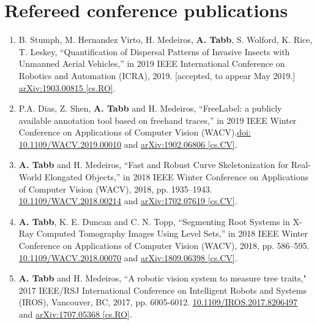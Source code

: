 \documentclass[letterpaper,11pt]{article}
\begin{document}
\section{Refereed conference publications}
\begin{enumerate}[noitemsep, leftmargin=*,resume*]
\item{B. Stumph, M. Hernandez Virto, H. Medeiros, \textbf{A. Tabb}, S. Wolford, K. Rice, T. Leskey, ``Quantification of Dispersal Patterns of Invasive Insects with Unmanned Aerial Vehicles,” in 2019 IEEE International Conference on Robotics and Automation (ICRA), 2019. [accepted, to appear May 2019.] \href{https://arxiv.org/abs/1903.00815}{arXiv:1903.00815 [cs.RO]}.}

\item{P.A.  Dias, Z. Shen, \textbf{A. Tabb} and H. Medeiros, ``FreeLabel: a publicly available annotation tool based on freehand traces,” in 2019 IEEE Winter Conference on Applications of Computer Vision (WACV).\href{https://doi.org/10.1109/WACV.2019.00010}{doi: 10.1109/WACV.2019.00010} and \href{https://arxiv.org/abs/1902.06806}{arXiv:1902.06806 [cs.CV]}.}

\item{\textbf{A. Tabb} and H. Medeiros, ``Fast and Robust Curve Skeletonization for Real-World Elongated Objects,” in 2018 IEEE Winter Conference on Applications of Computer Vision (WACV), 2018, pp. 1935–1943.
\href{https://doi.org/10.1109/WACV.2018.00214}{10.1109/WACV.2018.00214} and \href{https://arxiv.org/abs/1702.07619}{arXiv:1702.07619 [cs.CV]}.}

\item{\textbf{A. Tabb}, K. E. Duncan and C. N. Topp, ``Segmenting Root Systems in X-Ray Computed Tomography Images Using Level Sets,” in 2018 IEEE Winter Conference on Applications of Computer Vision (WACV), 2018, pp. 586–595. \href{https://doi.org/10.1109/WACV.2018.00070}{10.1109/WACV.2018.00070} and \href{https://arxiv.org/abs/1809.06398}{arXiv:1809.06398 [cs.CV]}.}

\item{\textbf{A. Tabb} and H. Medeiros, ``A robotic vision system to measure tree traits," 2017 IEEE/RSJ International Conference on Intelligent Robots and Systems (IROS), Vancouver, BC, 2017, pp. 6005-6012. \href{https://doi.org/10.1109/IROS.2017.8206497}{10.1109/IROS.2017.8206497} and \href{https://arxiv.org/abs/1707.05368}{arXiv:1707.05368 [cs.RO]}.}


\end{enumerate}
\end{document}
